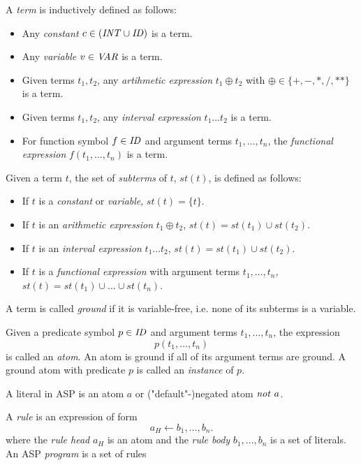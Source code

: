 \begin{definition}[Term]
\label{def:prelims-asp-syntax-term}
A \emph{term} is inductively defined as follows:
\begin{itemize}
	\item Any \emph{constant} $c \in (\mathit{INT} \cup \mathit{ID})$ is a term.
	\item Any \emph{variable} $v \in \mathit{VAR}$ is a term.
	\item Given terms $t_1, t_2$, any \emph{artihmetic expression} $t_1 \oplus t_2$ with $\oplus \in \{+, - , *, /, **\}$ is a term.
	\item Given terms $t_1, t_2$, any \emph{interval expression} $t_1 \ldots t_2$ is a term.
	\item For function symbol $f \in \mathit{ID}$ and argument terms $t_1, \ldots, t_n$, the \emph{functional expression} $f(t_1, \ldots, t_n)$ is a term.
\end{itemize}
\end{definition}

\begin{definition}[Subterms]
\label{def:prelims-asp-syntax-subterms}
Given a term $t$, the set of \emph{subterms} of $t$, $st(t)$, is defined as follows:
\begin{itemize}
	\item If $t$ is a \emph{constant} or \emph{variable}, $st(t) = \{t\}$.
	\item If $t$ is an \emph{arithmetic expression} $t_1 \oplus t_2$, $st(t) = st(t_1) \cup st(t_2)$.
	\item If $t$ is an \emph{interval expression} $t_1 \ldots t_2$, $st(t) = st(t_1) \cup st(t_2)$.
	\item If $t$ is a \emph{functional expression} with argument terms $t_1, \ldots, t_n$, $st(t) = st(t_1) \cup \ldots \cup st(t_n)$.
\end{itemize}
A term is called \emph{ground} if it is variable-free, i.e. none of its subterms is a variable.
\end{definition}

\begin{definition}[Atom]
\label{def:prelims-asp-syntax-atom}
Given a predicate symbol $p \in \mathit{ID}$ and argument terms $t_1,\ldots,t_n$, the expression
\[
	p(t_1,\ldots,t_n)
\]
is called an \emph{atom}. An atom is ground if all of its argument terms are ground. A ground atom with predicate $p$ is called an \emph{instance} of $p$.
\end{definition}

\begin{definition}[Literal]
\label{def:prelims-asp-syntax-literal}
A literal in ASP is an atom $a$ or ("default"-)negated atom $\NOT\ a$.
\end{definition}

\begin{definition}
\label{def:prelims-asp-syntax-rule}
A \emph{rule} is an expression of form
\[
	a_H \leftarrow b_1,\ldots,b_n.
\]
where the \emph{rule head} $a_H$ is an atom and the \emph{rule body} $b_1,\ldots,b_n$ is a set of literals. An ASP \emph{program} is a set of rules
\end{definition}
